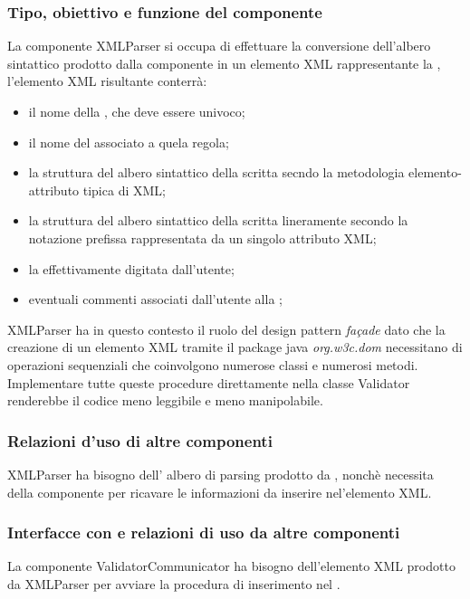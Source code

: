 \documentclass[11pt,titlepage,a4paper]{report}
\begin{document}
\subsubsection{Tipo, obiettivo e funzione del componente}
La componente XMLParser si occupa di effettuare la conversione dell'albero sintattico prodotto dalla componente \brp in un elemento XML rappresentante la \br, l'elemento XML risultante conterr\`a:
\begin{itemize}
 \item il nome della \br, che deve essere univoco;
 \item il nome del \bo associato a quela regola;
 \item la struttura del albero sintattico della \br scritta secndo la metodologia elemento-attributo tipica di XML;
 \item la struttura del albero sintattico della \br scritta lineramente secondo la notazione prefissa rappresentata da un singolo attributo XML;
 \item la \br effettivamente digitata dall'utente;
 \item eventuali commenti associati dall'utente alla \br;
\end{itemize}
XMLParser ha in questo contesto il ruolo del design pattern \textit{fa\c{c}ade} dato che la creazione di un elemento XML tramite il package java \textit{org.w3c.dom} necessitano di operazioni sequenziali che coinvolgono numerose classi e numerosi metodi. Implementare tutte queste procedure direttamente nella classe Validator renderebbe il codice meno leggibile e meno manipolabile.
\subsubsection{Relazioni d'uso di altre componenti}
XMLParser ha bisogno dell' albero di parsing prodotto da \brp, nonch\`e necessita della componente \br per ricavare le informazioni da inserire nel'elemento XML.
\subsubsection{Interfacce con e relazioni di uso da altre componenti}
La componente ValidatorCommunicator ha bisogno dell'elemento XML prodotto da XMLParser per avviare la procedura di inserimento nel \re.
\end{document}
